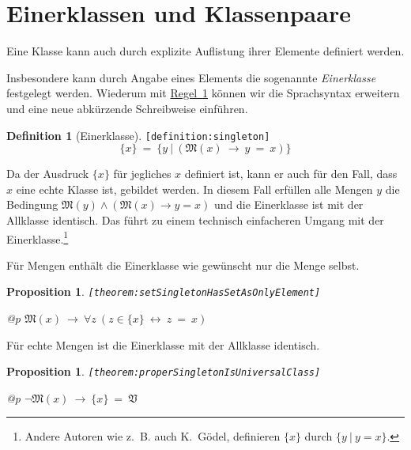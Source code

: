 \documentclass[a4paper,german,10pt,twoside]{book}
\newtheorem{prop}[thm]{Proposition}
\theoremstyle{definition}
\newtheorem{defn}{Definition}
\theoremstyle{remark}
\begin{document}
\section{Einerklassen und Klassenpaare} \label{chapter4_section4} \hypertarget{chapter4_section4}{}
Eine Klasse kann auch durch explizite Auflistung ihrer Elemente definiert werden.

\par
Insbesondere kann durch Angabe eines Elements die sogenannte \emph{Einerklasse} 
              festgelegt werden.
Wiederum mit \hyperlink{rule:classDefinition}{Regel~1} k{\"o}nnen wir die Sprachsyntax erweitern und eine neue abk{\"u}rzende Schreibweise einf{\"u}hren.

\begin{defn}[Einerklasse]
\label{definition:singleton} \hypertarget{definition:singleton}{}
{\tt \tiny [\verb]definition:singleton]]}
$$\{ x \} \ = \ \{ y \ | \ (\mathfrak{M}(x)\ \rightarrow\ y \ = \ x) \} $$
\end{defn}

Da der Ausdruck $\{x\}$ f{\"u}r jegliches $x$ definiert ist, kann er auch f{\"u}r den Fall, 
dass $x$ eine echte Klasse ist, gebildet werden. In diesem Fall erf{\"u}llen alle Mengen 
$y$ die Bedingung 
$\mathfrak{M}(y) \land (\mathfrak{M}(x) \rightarrow y = x)$ und die Einerklasse ist 
mit der Allklasse identisch. Das f{\"u}hrt zu einem technisch einfacheren Umgang mit der
Einerklasse.\footnote{Andere Autoren wie z.~B. auch K.~G{\"o}del, definieren $\{x\}$ durch
$\{y~|~y = x\}$.}


\par
F{\"u}r Mengen enth{\"a}lt die Einerklasse wie gew{\"u}nscht nur die Menge selbst.

\begin{prop}
\label{theorem:setSingletonHasSetAsOnlyElement} \hypertarget{theorem:setSingletonHasSetAsOnlyElement}{}
{\tt \tiny [\verb]theorem:setSingletonHasSetAsOnlyElement]]}
\mbox{}
\begin{longtable}{{@{\extracolsep{\fill}}p{\linewidth}}}
\centering $\mathfrak{M}(x)\ \rightarrow\ \forall z\ (z \in \{ x \}\ \leftrightarrow\ z \ = \ x)$
\end{longtable}

\end{prop}


\par
F{\"u}r echte Mengen ist die Einerklasse mit der Allklasse identisch.

\begin{prop}
\label{theorem:properSingletonIsUniversalClass} \hypertarget{theorem:properSingletonIsUniversalClass}{}
{\tt \tiny [\verb]theorem:properSingletonIsUniversalClass]]}
\mbox{}
\begin{longtable}{{@{\extracolsep{\fill}}p{\linewidth}}}
\centering $\neg \mathfrak{M}(x)\ \rightarrow\ \{ x \} \ = \ \mathfrak{V}$
\end{longtable}

\end{prop}
\end{document}
